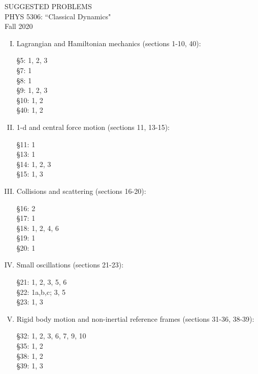 \documentclass[10pt]{article}
\numberwithin{equation}{section}
\def\ben{\begin{enumerate}}
\def\een{\end{enumerate}}
\def\i{\item{}}
\begin{document}
\begin{center}
SUGGESTED PROBLEMS\\
PHYS 5306: ``Classical Dynamics"\\
Fall 2020
\end{center}

\ben[I.]

\i Lagrangian and Hamiltonian mechanics (sections 1-10, 40):

\S 5: 1, 2, 3\\
\S 7: 1\\ 
\S 8: 1\\
\S 9: 1, 2, 3\\ 
\S 10: 1, 2\\
\S 40: 1, 2

\i 1-d and central force motion (sections 11, 13-15):

\S 11: 1\\
\S 13: 1\\
\S 14: 1, 2, 3\\ 
\S 15: 1, 3

\i Collisions and scattering (sections 16-20):

\S 16: 2\\
\S 17: 1\\
\S 18: 1, 2, 4, 6\\
\S 19: 1\\
\S 20: 1

\i Small oscillations (sections 21-23):

\S 21: 1, 2, 3, 5, 6\\
\S 22: 1a,b,c; 3, 5\\
\S 23: 1, 3

\i Rigid body motion and non-inertial reference frames (sections 31-36, 38-39):

\S 32: 1, 2, 3, 6, 7, 9, 10\\
\S 35: 1, 2\\
\S 38: 1, 2\\
\S 39: 1, 3

\een
\end{document}
